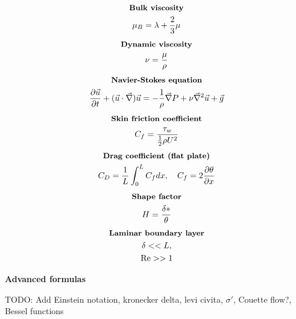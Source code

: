 \documentclass[10pt, a4paper]{article}
\begin{document}
\begin{multicols*}{2}
    \begin{gather*}
        \textbf{\small Bulk viscosity} \\
        \mu_B = \lambda + \frac23 \mu
    \end{gather*}
    \begin{gather*}
        \textbf{\small Dynamic viscosity} \\
        \nu = \frac{\mu}{\rho}
    \end{gather*}
    \begin{gather*}
        \textbf{\small Navier-Stokes equation} \\
        \frac{\partial \vec{u}}{\partial t} + (\vec{u}\cdot \vec{\nabla})\vec{u} = 
        -\frac{1}{\rho}\vec{\nabla}P + \nu \vec{\nabla}^2 \vec{u} + \vec{g}
    \end{gather*}
    \begin{gather*}
        \textbf{\small Skin friction coefficient} \\
        C_f = \frac{\tau_w}{\frac12 \rho U^2}
    \end{gather*}
    \begin{gather*}
        \textbf{\small Drag coefficient (flat plate)} \\
        C_D = \frac{1}{L}\int_0^L C_f dx, \quad C_f = 2\frac{\partial \theta}{\partial x}
    \end{gather*}
    \begin{gather*}
        \textbf{\small Shape factor} \\
        H = \frac{\delta *}{\theta}
    \end{gather*}
    \begin{gather*}
        \textbf{\small Laminar boundary layer} \\
        \delta << L, \\
        \text{Re} >> 1
    \end{gather*}
\end{multicols*}
\begin{center}
    \Large
    \textbf{Advanced formulas}
    \vspace{0.5cm}
\end{center}

TODO: Add Einstein notation, kronecker delta, levi civita, $\sigma '$, Couette flow?, Bessel functions
\end{document}
